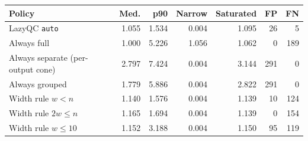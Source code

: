 \begin{tabular}{lrrrrrr}
\toprule
Policy & Med. & p90 & Narrow & Saturated & FP & FN\\
\midrule
LazyQC \texttt{auto} & 1.055 & 1.534 & 0.004 & 1.095 & 26 & 5\\
Always full & 1.000 & 5.226 & 1.056 & 1.062 & 0 & 189\\
Always separate (per-output cone) & 2.797 & 7.424 & 0.004 & 3.144 & 291 & 0\\
Always grouped & 1.779 & 5.886 & 0.004 & 2.822 & 291 & 0\\
Width rule $w<n$ & 1.140 & 1.576 & 0.004 & 1.139 & 10 & 124\\
Width rule $2w\leq n$ & 1.165 & 1.694 & 0.004 & 1.139 & 0 & 154\\
Width rule $w\leq10$ & 1.152 & 3.188 & 0.004 & 1.150 & 95 & 119\\
\bottomrule
\end{tabular}
